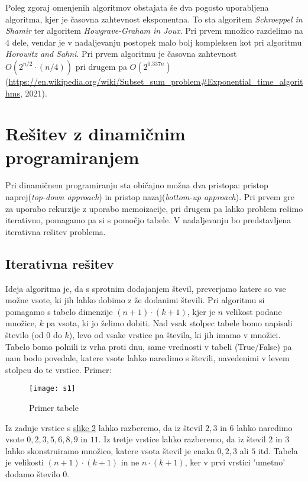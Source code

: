 \documentclass[12pt]{article}
\begin{document}
  Poleg zgoraj omenjenih algoritmov obstajata še dva pogosto uporabljena algoritma, kjer je časovna zahtevnost eksponentna.
  To sta algoritem \textit{Schroeppel in Shamir} ter algoritem   \textit{Howgrave-Graham in Joux}. 
  Pri prvem množico razdelimo na 4 dele, vendar je v nadaljevanju postopek malo bolj kompleksen kot pri algoritmu
  \textit{Horowitz and Sahni}. Pri prvem algoritmu je časovna zahtevnost ${O(2^{n/2}  \cdot  (n/4))}$ pri drugem pa
  $O(2^{0.337n})$ (\url{https://en.wikipedia.org/wiki/Subset_sum_problem#Exponential_time_algorithms}, 2021).



  \section{Rešitev z dinamičnim programiranjem}
  Pri dinamičnem programiranju sta običajno možna dva pristopa: pristop naprej(\textit{top-down approach}) in pristop nazaj(\textit{bottom-up approach}).
  Pri prvem gre za uporabo rekurzije z uporabo memoizacije, pri drugem pa lahko problem rešimo iterativno,
  pomagamo pa si s pomočjo tabele. V nadaljevanju bo predstavljena iterativna rešitev problema.



 \subsection{Iterativna rešitev}
 Ideja algoritma je, da s sprotnim dodajanjem števil, preverjamo katere so vse možne vsote, ki jih
 lahko dobimo z že dodanimi števili.\newline
 Pri algoritmu si pomagamo s tabelo dimenzije $(n+1) \cdot (k+1)$, kjer je
 $n$ velikost podane množice, $k$ pa vsota, ki jo želimo dobiti. Nad vsak stolpec tabele bomo napisali število (od 0 do $k$), 
 levo od vsake vrstice pa števila, ki jih imamo v množici. Tabelo bomo polnili iz vrha
 proti dnu, same vrednosti v tabeli (True/False) pa nam bodo povedale, katere vsote lahko naredimo s 
 števili, navedenimi v levem stolpcu do te vrstice. 
 \newline
Primer: \label{sec:s1}
\begin{figure}[h]
  \caption{Primer tabele}
  \label{sec:s2}
\texttt{[image: s1]}
\centering
\end{figure}\newline
Iz zadnje vrstice s \hyperref[sec:s2]{slike 2} lahko razberemo, da iz števil $2,3$ in $6$ lahko naredimo vsote $0,2,3,5,6,8,9$ in $11$.
Iz tretje vrstice lahko razberemo, da iz števil $2$ in $3$ lahko skonstruiramo množico, katere vsota števil 
je enaka $0,2,3$ ali $5$ itd.  
\newline Tabela je velikosti $(n+1)  \cdot  (k+1)$ in ne $n  \cdot  (k+1)$, ker v prvi vrstici
'umetno' dodamo število 0. \newpage
\end{document}
